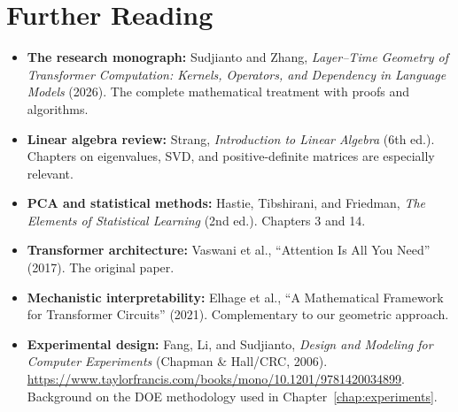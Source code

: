 \documentclass[11pt, twoside, openright]{memoir}
\begin{document}
\chapter*{Further Reading}

\begin{itemize}[nosep]
\item \textbf{The research monograph:} Sudjianto and Zhang,
  \emph{Layer--Time Geometry of Transformer Computation: Kernels,
  Operators, and Dependency in Language Models} (2026).
  The complete mathematical treatment with proofs and algorithms.

\item \textbf{Linear algebra review:} Strang, \emph{Introduction to
  Linear Algebra} (6th ed.). Chapters on eigenvalues, SVD, and
  positive-definite matrices are especially relevant.

\item \textbf{PCA and statistical methods:} Hastie, Tibshirani, and
  Friedman, \emph{The Elements of Statistical Learning} (2nd ed.).
  Chapters 3 and 14.

\item \textbf{Transformer architecture:} Vaswani et al.,
  ``Attention Is All You Need'' (2017). The original paper.

\item \textbf{Mechanistic interpretability:} Elhage et al.,
  ``A Mathematical Framework for Transformer Circuits'' (2021).
  Complementary to our geometric approach.

\item \textbf{Experimental design:} Fang, Li, and Sudjianto,
  \emph{Design and Modeling for Computer Experiments} (Chapman \& Hall/CRC, 2006).
  \url{https://www.taylorfrancis.com/books/mono/10.1201/9781420034899}.
  Background on the DOE methodology used in Chapter~\ref{chap:experiments}.
\end{itemize}
\end{document}

